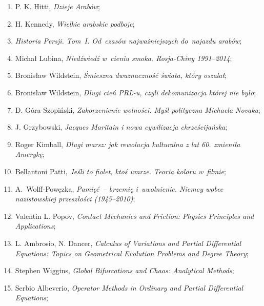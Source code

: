 \documentclass[a4paper,11pt]{article}
\begin{document}
\begin{enumerate}
\item P. K. Hitti, \textit{Dzieje Arabów};

\item H. Kennedy, \textit{Wielkie arabskie podboje};

\item \textit{Historia Persji. Tom~I. Od~czasów najważniejszych
    do~najazdu arabów};

\item Michał Lubina, \textit{Niedźwiedź w~cieniu smoka. Rosja-Chiny
    1991--2014};

\item Bronisław Wildstein, \textit{Śmieszna dwuznaczność świata, który
    oszalał};

\item Bronisław Wildstein, \textit{Długi cień PRL-u, czyli dekomunizacja
    której nie było};

\item D. Góra-Szopiński, \textit{Zakorzenienie wolności. Myśl polityczna
    Michaela Novaka};

\item J. Grzybowski, \textit{Jacques Maritain i nowa cywilizacja
    chrześcijańska};

\item Roger Kimball, \textit{Długi marsz: jak rewolucja kulturalna z lat
    60. zmieniła Amerykę};

\item Bellantoni Patti, \textit{Jeśli to fiolet, ktoś umrze. Teoria
    koloru w~filmie};

\item A.~Wolff-Powęzka, \textit{Pamięć~-- brzemię i~uwolnienie. Niemcy
    wobec nazistowskiej przeszłości (1945--2010)};

\item Valentin L. Popov, \textit{Contact Mechanics and Friction: Physics
    Principles and Applications};

\item L. Ambrosio, N. Dancer, \textit{Calculus of Variations and Partial
    Differential Equations: Topics on Geometrical Evolution Problems
    and Degree Theory};

\item Stephen Wiggins, \textit{Global Bifurcations and Chaos: Analytical
    Methods};

\item Serbio Albeverio, \textit{Operator Methods in Ordinary and Partial
    Differential Equations};


\end{enumerate}
\end{document}
